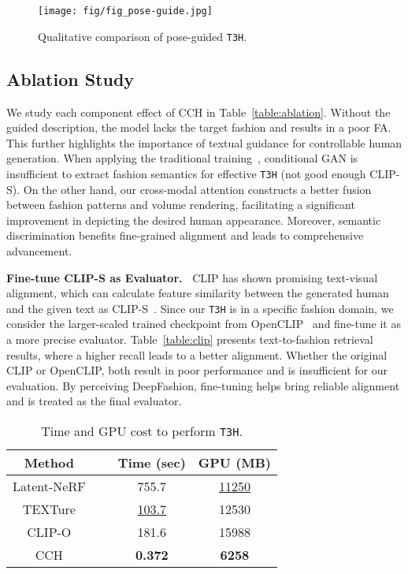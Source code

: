 \documentclass[11pt]{article}
\newcommand{\tablestyle}[2]{\setlength{\tabcolsep}{#1}\renewcommand{\arraystretch}{#2}\centering\footnotesize}
\begin{document}
\begin{figure*}[t]
\centering
    \texttt{[image: fig/fig\_pose-guide.jpg]}
    \vspace{-3.5ex}
    \caption{Qualitative comparison of pose-guided \texttt{T3H}.}
    \vspace{-2ex}
    \label{fig:pose-guide}
\end{figure*}

\subsection{Ablation Study}
We study each component effect of CCH in Table~\ref{table:ablation}. Without the guided description, the model lacks the target fashion and results in a poor FA. This further highlights the importance of textual guidance for controllable human generation. When applying the traditional training~\cite{reed2016t2i}, conditional GAN is insufficient to extract fashion semantics for effective \texttt{T3H} (not good enough CLIP-S). On the other hand, our cross-modal attention constructs a better fusion between fashion patterns and volume rendering, facilitating a significant improvement in depicting the desired human appearance. Moreover, semantic discrimination benefits fine-grained alignment and leads to comprehensive advancement.

\vspace{1ex} \noindent \textbf{Fine-tune CLIP-S as Evaluator.~}
CLIP has shown promising text-visual alignment, which can calculate feature similarity between the generated human and the given text as CLIP-S~\cite{hessel2021clip-s}. Since our \texttt{T3H} is in a specific fashion domain, we consider the larger-scaled trained checkpoint from OpenCLIP~\cite{openclip} and fine-tune it as a more precise evaluator. Table~\ref{table:clip} presents text-to-fashion retrieval results, where a higher recall leads to a better alignment. Whether the original CLIP or OpenCLIP, both result in poor performance and is insufficient for our evaluation. By perceiving DeepFashion, fine-tuning helps bring reliable alignment and is treated as the final evaluator.

\begin{table}[t]
\centering \tablestyle{5pt}{1.1}
    \begin{tabular}{cccc}
        \toprule
        Method & ~ & Time (sec) & GPU (MB) \\
        \midrule
        Latent-NeRF & ~ & 755.7 & \underline{11250} \\
        TEXTure & ~ & \underline{103.7} & 12530 \\
        CLIP-O & ~ & 181.6 & 15988 \\
        CCH & ~ & \textbf{0.372} & \textbf{6258} \\
        \bottomrule
    \end{tabular}
    \vspace{-1.5ex}
    \caption{Time and GPU cost to perform \texttt{T3H}.}
    \label{table:efficiency}
    \vspace{-3ex}
\end{table}
\end{document}
